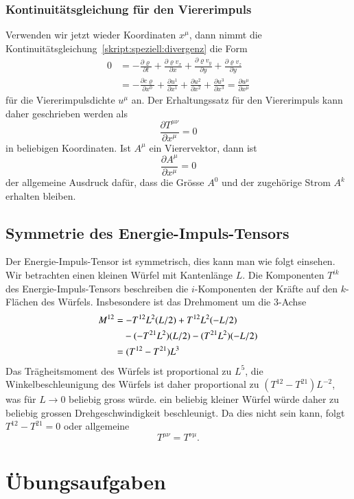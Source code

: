 \subsubsection{Kontinuitätsgleichung für den Viererimpuls}
Verwenden wir jetzt wieder Koordinaten $x^\mu$, dann nimmt die
Kontinuitätsgleichung~\eqref{skript:speziell:divergenz}
die Form
\begin{align*}
0
&=
-
\frac{\partial \varrho}{\partial t}
+
\frac{\partial \varrho v_x}{\partial x}
+
\frac{\partial \varrho v_y}{\partial y}
+
\frac{\partial \varrho v_z}{\partial y}
\\
&=
-\frac{\partial c \varrho}{\partial x^0}
+\frac{\partial u^1}{\partial x^1}
+\frac{\partial u^2}{\partial x^2}
+\frac{\partial u^3}{\partial x^3}
=
\frac{\partial u^\mu}{\partial x^\mu}
\end{align*}
für die Viererimpulsdichte $u^\mu$ an.
Der Erhaltungssatz für den Viererimpuls kann daher
geschrieben werden als
\begin{equation}
\frac{\partial T^{\mu\nu}}{\partial x^\mu}
=0
\label{skript:speziell:energieerhaltung}
\end{equation}
in beliebigen Koordinaten.
Ist $A^{\mu}$ ein Vierervektor, dann ist
\[
\frac{\partial A^\mu}{\partial x^\mu}=0
\]
der allgemeine Ausdruck dafür, dass die Grösse $A^0$ und der zugehörige
Strom $A^k$ erhalten bleiben.

\subsection{Symmetrie des Energie-Impuls-Tensors}
Der Energie-Impuls-Tensor ist symmetrisch, dies kann man wie folgt einsehen.
Wir betrachten einen kleinen Würfel mit Kantenlänge $L$.
Die Komponenten $T^{ik}$ des Energie-Impuls-Tensors beschreiben die
$i$-Komponenten der Kräfte auf den $k$-Flächen des Würfels.
Insbesondere ist das Drehmoment um die $3$-Achse
\begin{align*}
M^{12}
&=
-T^{12}L^2(L/2) + T^{12}L^2 (-L/2)
\\
&\phantom{\mathstrut=}-(-T^{21}L^2)(L/2)-(T^{21}L^2)(-L/2)
\\
&=(T^{12}-T^{21})L^3
\end{align*}
Das Trägheitsmoment des Würfels ist proportional zu $L^5$,
die Winkelbeschleunigung des Würfels ist daher proportional
zu $(T^{12}-T^{21})L^{-2}$, was für $L\to 0$ beliebig gross würde.
ein beliebig kleiner Würfel würde daher zu beliebig grossen 
Drehgeschwindigkeit beschleunigt.
Da dies nicht sein kann, folgt $T^{12}-T^{21}=0$ oder allgemeine
\[
T^{\mu\nu}=T^{\nu\mu}.
\]


\section*{Übungsaufgaben}

